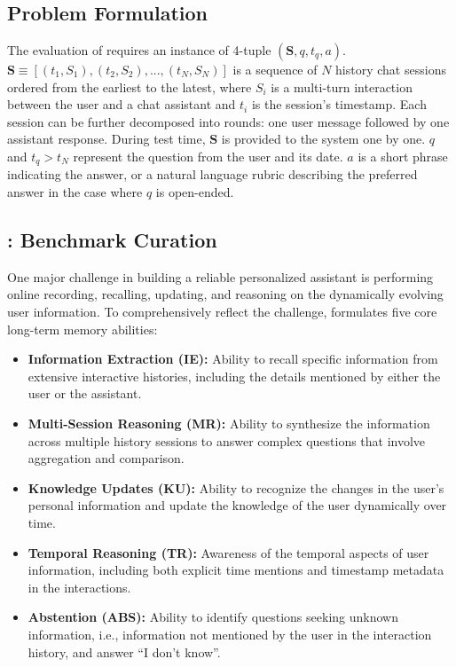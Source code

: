 \section{\BENCHMARK{}}

\subsection{Problem Formulation}

The evaluation of \BENCHMARK{} requires an instance of 4-tuple $(\mathbf{S}, q, t_q, a)$. $\mathbf{S} \equiv [(t_1, S_1), (t_2, S_2), ..., (t_N, S_N)]$ is a sequence of $N$ history chat sessions ordered from the earliest to the latest, where $S_i$ is a multi-turn interaction between the user and a chat assistant and $t_i$ is the session's timestamp. {Each session can be further decomposed into rounds: one user message followed by one assistant response.} During test time, $\mathbf{S}$ is provided to the system one by one. $q$ and $t_q > t_N$ represent the question from the user and its date. $a$ is a short phrase indicating the answer, or a natural language rubric describing the preferred answer in the case where $q$ is open-ended.  

\subsection{{\BENCHMARK: Benchmark Curation}}
\label{section-benchmark-creation}

One major challenge in building a reliable personalized assistant is performing online recording, recalling, updating, and reasoning on the dynamically evolving user information. To comprehensively reflect the challenge, \BENCHMARK{} formulates five core long-term memory abilities:

\begin{itemize}
    \item \textbf{Information Extraction (IE):} Ability to recall specific information from extensive interactive histories, including the details mentioned by either the user or the assistant. 
    \item \textbf{Multi-Session Reasoning (MR):} Ability to synthesize the information across multiple history sessions to answer complex questions that involve aggregation and comparison. 
    \item \textbf{Knowledge Updates (KU):} Ability to recognize the changes in the user's personal information and update the knowledge of the user dynamically over time.  
    \item \textbf{Temporal Reasoning (TR):} Awareness of the temporal aspects of user information, including both explicit time mentions and timestamp metadata in the interactions. 
    \item \textbf{Abstention (ABS):} Ability to identify questions seeking unknown information, i.e., information not mentioned by the user in the interaction history, and answer ``I don't know''. 
\end{itemize}

